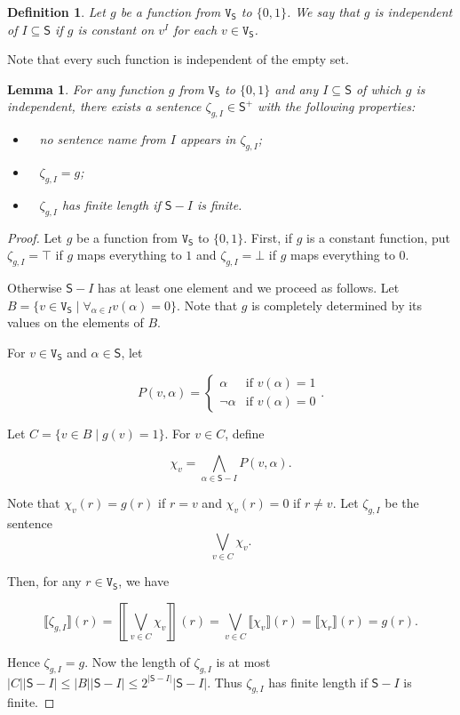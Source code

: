 \documentclass[12pt]{kluwer}
\newtheorem{lem}[thm]{Lemma}
\newtheorem{defn}{Definition}
\theoremstyle{remark}
\def\S{\textsf{S}}
\def\V{\texttt{V}}
\begin{document}
\begin{defn}
Let $g$ be a function from $\V_\S$ to $\{0, 1\}$.  We say that $g$ is \emph{independent of} $I \subseteq \S$ if $g$ is constant on $v^I$ for each $v \in \V_\S$.
\end{defn}

Note that every such function is independent of the empty set.

\begin{lem}\label{LanguageIsComplete}
For any function $g$ from $\V_\S$ to $\{0, 1\}$ and any $I \subseteq \S$ of which $g$ is independent, there exists a sentence $\zeta_{g, I} \in \S^+$ with the following properties:
\begin{itemize}
\item $\;\;$ no sentence name from $I$ appears in $\zeta_{g, I}$;  
\item $\;\;$ $\zeta_{g, I} = g$;
\item $\;\;$ $\zeta_{g, I}$ has finite length if $\S - I$ is finite.
\end{itemize}
\end{lem}

\begin{proof}
Let $g$ be a function from $\V_\S$ to  $\{0, 1\}$.  First, if $g$ is a constant function, put $\zeta_{g, I} = \top$ if $g$ maps everything to $1$ and $\zeta_{g, I} = \bot$ if $g$ maps everything to $0$.

Otherwise $\S - I$ has at least one element and we proceed as follows.  Let $B = \{v \in \V_\S \mid \forall_{\alpha \in I} v(\alpha) = 0\}$. Note that $g$ is completely determined by its values on the elements of $B$.

For $v \in \V_\S$ and $\alpha \in \S$, let 

\[P(v, \alpha) = \begin{cases}
\alpha & \text{if } v(\alpha) = 1 \\
\neg \alpha & \text{if } v(\alpha) = 0
\end{cases}.\]

Let $C = \{v \in B \mid g(v) = 1 \}$. For $v \in C$, define

\[\chi_v = \bigwedge_{\alpha \in \S - I} P(v, \alpha).\] 

Note that $\chi_v(r) = g(r)$ if $r = v$ and $\chi_v(r) = 0$ if $r \neq v$. Let $\zeta_{g, I}$ be the sentence
\[\bigvee_{v \in C} \chi_v.\]

Then, for any $r \in \V_\S$, we have 

\[\llbracket \zeta_{g, I} \rrbracket(r) = \left\llbracket\bigvee_{v \in C} \chi_v \right\rrbracket(r) = \bigvee_{v \in C} \llbracket \chi_v \rrbracket(r) = \llbracket \chi_r \rrbracket(r) = g(r).\]

Hence $\zeta_{g, I} = g$.  Now the length of  $\zeta_{g, I}$ is at most $|C||\S - I| \leq |B||\S - I| \leq 2^{|\S - I|}|\S - I|$. Thus $\zeta_{g, I}$ has finite length if  $\S - I$ is finite. 
\end{proof}
\end{document}
